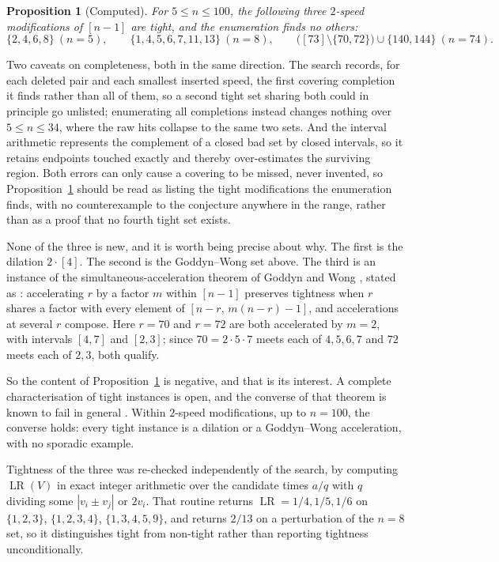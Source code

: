 \documentclass[11pt]{amsart}
\theoremstyle{plain}
\newtheorem{proposition}[theorem]{Proposition}
\theoremstyle{definition}
\newcommand{\LR}{\operatorname{LR}}
\begin{document}
\begin{proposition}[Computed]\label{prop:tight2}
For $5\le n\le100$, the following three $2$-speed modifications of $[n-1]$ are tight, and the
enumeration finds no others:
\[
  \{2,4,6,8\}\ (n=5),\qquad \{1,4,5,6,7,11,13\}\ (n=8),\qquad
  \bigl([73]\setminus\{70,72\}\bigr)\cup\{140,144\}\ (n=74).
\]
\end{proposition}

Two caveats on completeness, both in the same direction. The search records, for each deleted pair
and each smallest inserted speed, the first covering completion it finds rather than all of them, so
a second tight set sharing both could in principle go unlisted; enumerating all completions instead
changes nothing over $5\le n\le34$, where the raw hits collapse to the same two sets. And the
interval arithmetic represents the complement of a closed bad set by closed intervals, so it retains
endpoints touched exactly and thereby over-estimates the surviving region. Both errors can only
cause a covering to be missed, never invented, so Proposition~\ref{prop:tight2} should be read as
listing the tight modifications the enumeration finds, with no counterexample to the conjecture
anywhere in the range, rather than as a proof that no fourth tight set exists.

None of the three is new, and it is worth being precise about why. The first is the dilation
$2\cdot[4]$. The second is the Goddyn--Wong set above. The third is an instance of the
simultaneous-acceleration theorem of Goddyn and Wong \cite{gw}, stated as \cite[Thm.~12]{ps}:
accelerating $r$ by a factor $m$ within $[n-1]$ preserves tightness when $r$
shares a factor with every element of $[n-r,\,m(n-r)-1]$, and accelerations at several $r$ compose.
Here $r=70$ and $r=72$ are both accelerated by $m=2$, with intervals $[4,7]$ and $[2,3]$; since
$70=2\cdot5\cdot7$ meets each of $4,5,6,7$ and $72$ meets each of $2,3$, both qualify.

So the content of Proposition~\ref{prop:tight2} is negative, and that is its interest. A complete
characterisation of tight instances is open, and the converse of that theorem is known to fail in
general \cite{ps}. Within $2$-speed modifications, up to $n=100$, the converse holds: every tight
instance is a dilation or a Goddyn--Wong acceleration, with no sporadic example.

Tightness of the three was re-checked independently of the search, by computing $\LR(V)$ in exact
integer arithmetic over the candidate times $a/q$ with $q$ dividing some $|v_i\pm v_j|$ or $2v_i$.
That routine returns $\LR=1/4,1/5,1/6$ on $\{1,2,3\}$, $\{1,2,3,4\}$, $\{1,3,4,5,9\}$, and returns
$2/13$ on a perturbation of the $n=8$ set, so it distinguishes tight from non-tight rather than
reporting tightness unconditionally.
\end{document}
